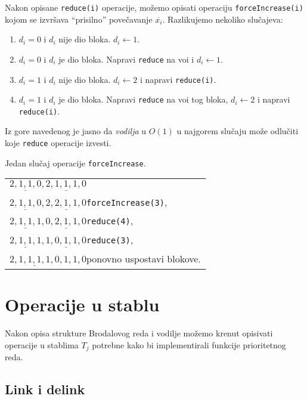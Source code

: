 Nakon opisane \texttt{reduce(i)} operacije, mo\v{z}emo opisati operaciju \texttt{forceIncrease(i)} kojom se izvr\v{s}ava ``prisilno'' pove\v{c}avanje $\overline{x_{i}}$.
Razlikujemo nekoliko slu\v{c}ajeva:
\begin{enumerate}
  \item $d_{i} = 0$ i $d_{i}$ nije dio bloka. $d_{i} \leftarrow 1$.
  \item $d_{i} = 0$ i $d_{i}$ je dio bloka. Napravi \texttt{reduce} na vo\dj i i $d_{i} \leftarrow 1$.
  \item $d_{i} = 1$ i $d_{i}$ nije dio bloka. $d_{i} \leftarrow 2$ i napravi \texttt{reduce(i)}.
  \item $d_{i} = 1$ i $d_{i}$ je dio bloka. Napravi \texttt{reduce} na vo\dj i tog bloka, $d_{i} \leftarrow 2$ i napravi \texttt{reduce(i)}.
\end{enumerate}

Iz gore navedenog je jasno da \emph{vodilja} u $O(1)$ u najgorem slu\v{c}aju mo\v{z}e odlu\v{c}iti koje \texttt{reduce} operacije izvesti.

\begin{exa}
  Jedan slu\v{c}aj operacije \texttt{forceIncrease}.
  \begin{center}
    \begin{tabular}{l}
      $\underline{2,1,1,0},\underline{2,1,1,1,0}$\\
      $\underline{2,1,1,0},\underline{2,2,1,1,0}$\qquad \texttt{forceIncrease(3)},\\
      $\underline{2,1,1,1},\underline{0,2,1,1,0}$\qquad \texttt{reduce(4)},\\
      $\underline{2,1,1,1},\underline{1,0,1,1,0}$\qquad \texttt{reduce(3)},\\
      $\underline{2,1,1,1,1,0},1,1,0$\qquad ponovno uspostavi blokove.\\
    \end{tabular}
  \end{center}
\end{exa}

\section{Operacije u stablu}

Nakon opisa strukture Brodalovog reda i vodilje mo\v{z}emo krenut opisivati operacije u stablima $T_{j}$ potrebne kako bi implementirali funkcije prioritetnog reda.

\subsection{Link i delink}\label{link_delink}

